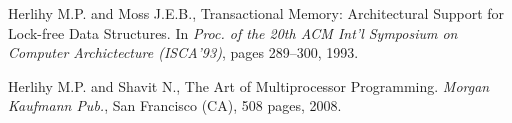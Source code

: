 \begin{thebibliography}{99}
{%
% 
% 




Herlihy M.P.  and Moss J.E.B., 
Transactional Memory: Architectural Support for Lock-free Data Structures. 
In {\it Proc. of the 20th ACM Int'l Symposium  on Computer Archictecture (ISCA'93)}, 
pages 289--300, 1993. 


% 
% 
% 
% 




Herlihy M.P.  and Shavit N.,
The Art of Multiprocessor Programming. 
{\it Morgan Kaufmann Pub.}, San Francisco (CA), 508 pages, 2008. 

}
\end{thebibliography}
